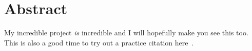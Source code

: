 \chapter*{Abstract}
\vspace{1cm}

\noindent
My incredible project \emph{is} incredible and I will hopefully make you see
this too. This is also a good time to try out a practice citation
here~\cite{latexbook1}.
